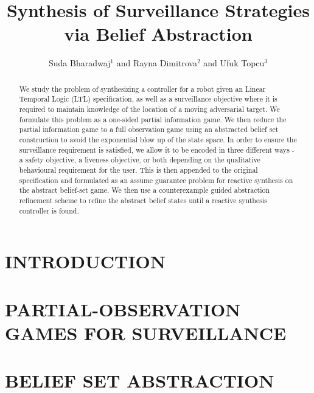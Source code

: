 \documentclass[letterpaper, 10 pt, conference]{ieeeconf}  %
\title{\LARGE \bf Synthesis of Surveillance Strategies via Belief Abstraction
}
\author{Suda Bharadwaj$^{1}$ and Rayna Dimitrova$^{2}$ and Ufuk Topcu$^{3}$%
}
\begin{document}
\maketitle
\thispagestyle{empty}
\pagestyle{empty}


\begin{abstract}
We study the problem of synthesizing a controller for a robot given an Linear Temporal Logic (LTL) specification, as well as a surveillance objective where it is required to maintain knowledge of the location of a moving adversarial target. We formulate this problem as a one-sided partial information game. We then reduce the partial information game to a full observation game using an abstracted belief set construction to avoid the exponential blow up of the state space. In order to ensure the surveillance requirement is satisfied, we allow it to be encoded in three different ways - a safety objective, a liveness objective, or both depending on the qualitative behavioural requirement for the user. This is then appended to the original specification and formulated as an assume guarantee problem for reactive synthesis on the abstract belief-set game. We then use a counterexample guided abstraction refinement scheme to refine the abstract belief states until a reactive synthesis controller is found.
\end{abstract}


\section{INTRODUCTION}




\section{PARTIAL-OBSERVATION GAMES FOR SURVEILLANCE}



\section{BELIEF SET ABSTRACTION}
\end{document}
